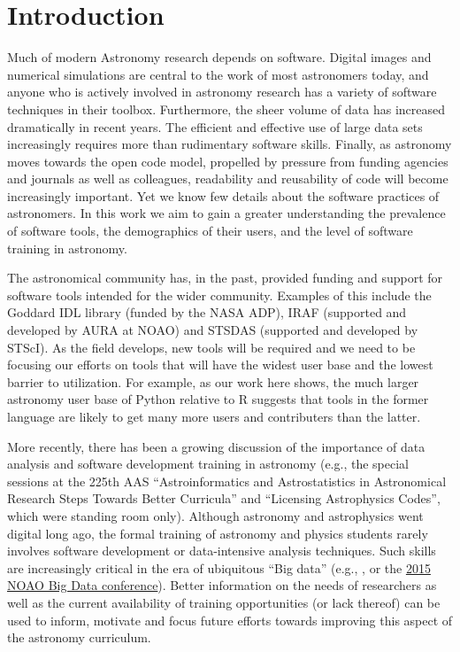 \section{Introduction}
\label{sec:intro}

Much of modern Astronomy research depends on software. Digital images and numerical simulations are central to the work of most astronomers today, and anyone who is actively involved in astronomy research has a variety of software techniques in their toolbox. Furthermore, the sheer volume of data has increased dramatically in recent years. The efficient and effective use of large data sets increasingly requires more than rudimentary software skills. Finally, as astronomy moves towards the open code model, propelled by pressure from funding agencies and journals as well as colleagues, readability and reusability of code will become increasingly important. Yet we know few details about the software practices of astronomers. In this work we aim to gain a greater understanding the prevalence of software tools, the demographics of their users, and the level of software training in astronomy.

The astronomical community has, in the past, provided funding and support for software tools intended for the wider community. Examples of this include the Goddard IDL library (funded by the NASA ADP), IRAF (supported and developed by AURA at NOAO) and STSDAS (supported and developed by STScI). As the field develops, new tools will be required and we need to be focusing our efforts on tools that will have the widest user base and the lowest barrier to utilization. For example, as our work here shows, the much larger astronomy user base of Python relative to R suggests that tools in the former language are likely to get many more users and contributers than the latter. 

More recently, there has been a growing discussion of the importance of data analysis and software development training in astronomy (e.g., the special sessions at the 225th AAS ``Astroinformatics and Astrostatistics in Astronomical Research Steps Towards Better Curricula'' and ``Licensing Astrophysics Codes'', which were standing room only). Although astronomy and astrophysics went digital long ago, the formal training of astronomy and physics students rarely involves software development or data-intensive analysis techniques. Such skills are increasingly critical in the era of ubiquitous ``Big data'' (e.g., \citet{Berriman_2011}, or the \href{http://www.noao.edu/meetings/bigdata/}{2015 NOAO Big Data conference}). Better information on the needs of researchers as well as the current availability of training opportunities (or lack thereof) can be used to inform, motivate and focus future efforts towards improving this aspect of the astronomy curriculum. 

